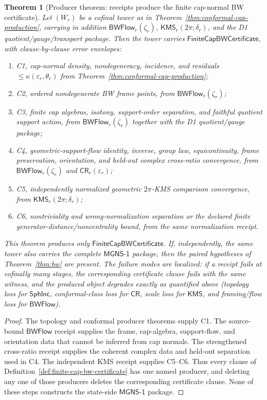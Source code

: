 \documentclass[11pt]{article}
\newtheorem{theorem}{Theorem}[section]
\begin{document}
\begin{theorem}[Producer theorem: receipts produce the finite cap-normal BW certificate]
\label{thm:certificate-production}
Let \((W_r)\) be a cofinal tower as in
Theorem~\ref{thm:conformal-cap-production}, carrying in addition
\(\mathsf{BWFlow}_r(\zeta_r)\),
\(\mathsf{KMS}_r(2\pi;\delta_r)\), and the D1 quotient/gauge/transport
package. Then the tower
carries \(\mathsf{FiniteCapBWCertificate}\), with clause-by-clause error
envelopes:
\begin{enumerate}[leftmargin=2em]
\item C1, cap-normal density, nondegeneracy, incidence, and residuals
\(\leq\kappa(\varepsilon_r,\theta_r)\) from
Theorem~\ref{thm:conformal-cap-production};
\item C2, ordered nondegenerate BW frame points, from
\(\mathsf{BWFlow}_r(\zeta_r)\);
\item C3, finite cap algebras, isotony, support-order separation, and faithful
quotient support action, from \(\mathsf{BWFlow}_r(\zeta_r)\) together with the
D1 quotient/gauge package;
\item C4, geometric-support-flow identity, inverse, group law, equicontinuity, frame preservation,
orientation, and held-out complex cross-ratio convergence, from
\(\mathsf{BWFlow}_r(\zeta_r)\) and
\(\mathsf{CR}_r(\varepsilon_r)\);
\item C5, independently normalized geometric \(2\pi\)-KMS comparison convergence,
from \(\mathsf{KMS}_r(2\pi;\delta_r)\);
\item C6, nontriviality and wrong-normalization separation or the declared
finite generator-distance/noncentrality bound, from the same normalization
receipt.
\end{enumerate}
This theorem produces only \(\mathsf{FiniteCapBWCertificate}\). If, independently,
the same tower also carries the complete \(\mathsf{MGNS\text{-}1}\) package,
then the paired hypotheses of Theorem~\ref{thm:bw} are present. The failure modes are
localized: if a receipt fails at cofinally many stages, the corresponding
certificate clause fails with the same witness, and the produced object
degrades exactly as quantified above (topology loss for
\(\mathsf{SphInc}\), conformal-class loss for \(\mathsf{CR}\), scale loss for
\(\mathsf{KMS}\), and framing/flow loss for \(\mathsf{BWFlow}\)).
\end{theorem}

\begin{proof}
The topology and conformal producer theorems supply C1. The source-bound
\(\mathsf{BWFlow}\) receipt supplies the frame, cap-algebra, support-flow, and
orientation data that cannot be inferred from cap normals. The strengthened
cross-ratio receipt supplies the coherent complex data and held-out separation
used in C4. The independent KMS receipt supplies C5--C6.
Thus every clause of Definition~\ref{def:finite-cap-bw-certificate} has one
named producer, and deleting any one of those producers deletes the
corresponding certificate clause. None of these steps constructs the
state-side \(\mathsf{MGNS\text{-}1}\) package.
\end{proof}
\end{document}
